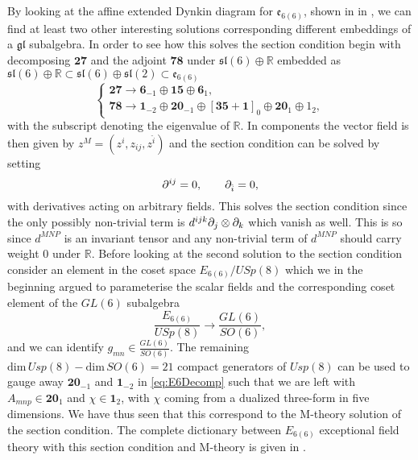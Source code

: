 By looking at the affine extended Dynkin diagram for $\mathfrak{e}_{6(6)}$, shown in in , we can find at least two other interesting solutions corresponding different embeddings of a $\mathfrak{gl}$ subalgebra. In order to see how this solves the section condition begin with decomposing $\mathbf{27}$ and the adjoint $\mathbf{78}$ under $\mathfrak{sl}(6)\oplus\mathbb{R}$ embedded as $\mathfrak{sl}(6)\oplus\mathbb{R}\subset\mathfrak{sl}(6)\oplus\mathfrak{sl}(2)\subset\mathfrak{e}_{6(6)}$ 
\begin{equation}
    \begin{cases}\label{eq:E6Decomp}
        \mathbf{27}\to \mathbf{6}_{-1}\oplus\mathbf{15}\oplus \mathbf{6}_{1},\\
        \mathbf{78}\to \mathbf{1}_{-2}\oplus\mathbf{20}_{-1}\oplus\left[\mathbf{35}+\mathbf{1}\right]_{0}\oplus\mathbf{20}_{1}\oplus 1_{2},
    \end{cases}
\end{equation}
with the subscript denoting the eigenvalue of $\mathbb{R}$. In components the vector field is then given by $z^M = (z^i,z_{ij},z^{\hat{i}})$ and the section condition can be solved by setting
\begin{equation}
    \partial^{ij} = 0,\qquad \partial_{\hat{i}} = 0,
\end{equation}
with derivatives acting on arbitrary fields. This solves the section condition since the only possibly non-trivial term is $d^{ijk}\partial_j\otimes\partial_k$ which vanish as well. This is so since $d^{MNP}$ is an invariant tensor and any non-trivial term of $d^{MNP}$ should carry weight $0$ under $\mathbb{R}$. Before looking at the second solution to the section condition consider an element in the coset space $E_{6(6)}/USp(8)$ which we in the beginning argued to parameterise the scalar fields and the corresponding coset element of the $GL(6)$ subalgebra
\begin{equation}
    \frac{E_{6(6)}}{USp(8)}\to \frac{GL(6)}{SO(6)},
\end{equation}
and we can identify $g_{mn}\in\frac{GL(6)}{SO(6)}$. The remaining $\text{dim}\, Usp(8)-\text{dim}\, SO(6)=21$ compact generators of $Usp(8)$ can be used to gauge away $\mathbf{20}_{-1}$ and $\mathbf{1}_{-2}$ in \eqref{eq:E6Decomp} such that we are left with $A_{mnp}\in \mathbf{20}_1$ and $\chi\in \mathbf{1}_{2}$, with $\chi$ coming from a dualized three-form in five dimensions. We have thus seen that this correspond to the M-theory solution of the section condition. The complete dictionary between $E_{6(6)}$ exceptional field theory with this section condition and M-theory is given in \cite{E62014}. 

